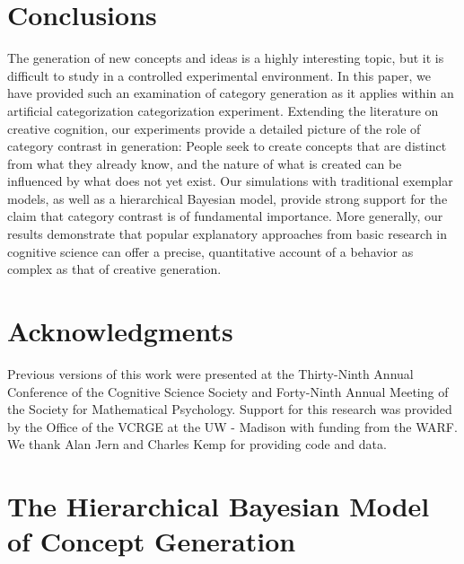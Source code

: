 \documentclass[12pt]{article}
\begin{document}
\begin{flushleft}
\section{Conclusions}

The generation of new concepts and ideas is a highly interesting topic, but it is difficult to study in a controlled experimental environment. In this paper, we have provided such an examination of category generation as it applies within an artificial categorization categorization experiment. Extending the literature on creative cognition, our experiments provide a detailed picture of the role of category contrast in generation: People seek to create concepts that are distinct from what they already know, and the nature of what is created can be influenced by what does not yet exist. Our simulations with traditional exemplar models, as well as a hierarchical Bayesian model, provide strong support for the claim that category contrast is of fundamental importance. More generally, our results demonstrate that popular explanatory approaches from basic research in cognitive science can offer a precise, quantitative account of a behavior as complex as that of creative generation.


\clearpage
\section{Acknowledgments}
Previous versions of this work were presented at the Thirty-Ninth Annual Conference of the Cognitive Science Society and Forty-Ninth Annual Meeting of the Society for Mathematical Psychology. Support for this research was provided by the Office of the VCRGE at the UW - Madison with funding from the WARF. We thank Alan Jern and Charles Kemp for providing code and data.
\end{flushleft}


\clearpage


\clearpage


\appendix
{}

\section{The Hierarchical Bayesian Model of Concept Generation}
\label{ap:hsampling-definition}
\end{document}

